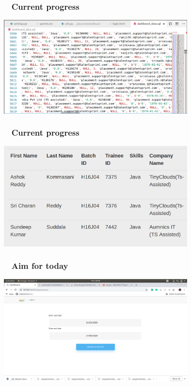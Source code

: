 \documentclass{beamer}
\begin{document}
\begin{frame}
\frametitle{ ~ Current progress}
\begin{center}
\includegraphics[width = 10cm]{1.png}
\end{center}
\end{frame}

\begin{frame}
\frametitle{ ~ Current progress}
\begin{center}
\includegraphics[width = 10cm]{2.png}
\end{center}
\end{frame}

\begin{frame}
\frametitle{ ~ Aim for today}
\begin{center}
\includegraphics[width = 10cm]{3.png}
\end{center}
\end{frame}
\end{document}

